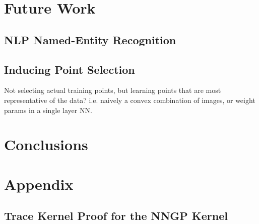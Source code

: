 \documentclass{article}
\numberwithin{equation}{section}
\begin{document}
\section{Future Work}
\subsection{NLP Named-Entity Recognition}
\subsection{Inducing Point Selection}
Not selecting actual training points, but learning points that are most representative of the data? i.e. naively a convex combination of images, or weight params in a single layer NN.

\newpage
\section{Conclusions}

\newpage



\newpage
\appendix
\section{Appendix}

\subsection{Trace Kernel Proof for the NNGP Kernel}\label{svgp-kld-bayesian}
\end{document}

